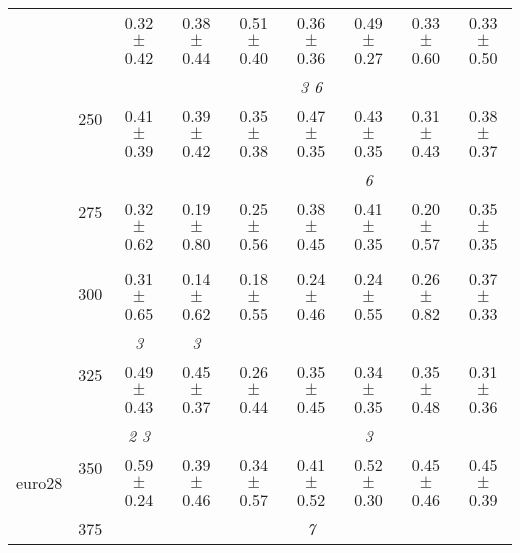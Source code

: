 \begin{table}[h]
{\begin{tabular}{
        ccccccccc}
 & & \cellcolor[HTML]{EFEFEF} 0.32 $\pm$ 0.42& \cellcolor[HTML]{EFEFEF} 0.38 $\pm$ 0.44& \cellcolor[HTML]{EFEFEF} 0.51 $\pm$ 0.40& \cellcolor[HTML]{EFEFEF} 0.36 $\pm$ 0.36& \cellcolor[HTML]{EFEFEF} 0.49 $\pm$ 0.27& \cellcolor[HTML]{EFEFEF} 0.33 $\pm$ 0.60& \cellcolor[HTML]{EFEFEF} 0.33 $\pm$ 0.50 \\ 
 & \multirow{2}{*}{250}& & & & \textit{ 3 6 }& & &  \\ 
 & & 0.41 $\pm$ 0.39& 0.39 $\pm$ 0.42& 0.35 $\pm$ 0.38& 0.47 $\pm$ 0.35& 0.43 $\pm$ 0.35& 0.31 $\pm$ 0.43& 0.38 $\pm$ 0.37 \\ 
 & \multirow{2}{*}{275}& \cellcolor[HTML]{EFEFEF} & \cellcolor[HTML]{EFEFEF} & \cellcolor[HTML]{EFEFEF} & \cellcolor[HTML]{EFEFEF} & \cellcolor[HTML]{EFEFEF} \textit{ 6 }& \cellcolor[HTML]{EFEFEF} & \cellcolor[HTML]{EFEFEF}  \\ 
 & & \cellcolor[HTML]{EFEFEF} 0.32 $\pm$ 0.62& \cellcolor[HTML]{EFEFEF} 0.19 $\pm$ 0.80& \cellcolor[HTML]{EFEFEF} 0.25 $\pm$ 0.56& \cellcolor[HTML]{EFEFEF} 0.38 $\pm$ 0.45& \cellcolor[HTML]{EFEFEF} 0.41 $\pm$ 0.35& \cellcolor[HTML]{EFEFEF} 0.20 $\pm$ 0.57& \cellcolor[HTML]{EFEFEF} 0.35 $\pm$ 0.35 \\ 
 & \multirow{2}{*}{300}& & & & & & &  \\ 
 & & 0.31 $\pm$ 0.65& 0.14 $\pm$ 0.62& 0.18 $\pm$ 0.55& 0.24 $\pm$ 0.46& 0.24 $\pm$ 0.55& 0.26 $\pm$ 0.82& 0.37 $\pm$ 0.33 \\ 
 & \multirow{2}{*}{325}& \cellcolor[HTML]{EFEFEF} \textit{ 3 }& \cellcolor[HTML]{EFEFEF} \textit{ 3 }& \cellcolor[HTML]{EFEFEF} & \cellcolor[HTML]{EFEFEF} & \cellcolor[HTML]{EFEFEF} & \cellcolor[HTML]{EFEFEF} & \cellcolor[HTML]{EFEFEF}  \\ 
 & & \cellcolor[HTML]{EFEFEF} 0.49 $\pm$ 0.43& \cellcolor[HTML]{EFEFEF} 0.45 $\pm$ 0.37& \cellcolor[HTML]{EFEFEF} 0.26 $\pm$ 0.44& \cellcolor[HTML]{EFEFEF} 0.35 $\pm$ 0.45& \cellcolor[HTML]{EFEFEF} 0.34 $\pm$ 0.35& \cellcolor[HTML]{EFEFEF} 0.35 $\pm$ 0.48& \cellcolor[HTML]{EFEFEF} 0.31 $\pm$ 0.36 \\ 
 \multirow{4}{*}{euro28} & \multirow{2}{*}{350}& \textit{ 2 3 }& & & & \textit{ 3 }& &  \\ 
 & & 0.59 $\pm$ 0.24& 0.39 $\pm$ 0.46& 0.34 $\pm$ 0.57& 0.41 $\pm$ 0.52& 0.52 $\pm$ 0.30& 0.45 $\pm$ 0.46& 0.45 $\pm$ 0.39 \\ 
 & \multirow{2}{*}{375}& \cellcolor[HTML]{EFEFEF} & \cellcolor[HTML]{EFEFEF} & \cellcolor[HTML]{EFEFEF} & \cellcolor[HTML]{EFEFEF} \textit{ 7 }& \cellcolor[HTML]{EFEFEF} & \cellcolor[HTML]{EFEFEF} & \cellcolor[HTML]{EFEFEF}  \\ 

\end{tabular}}
\end{table}
